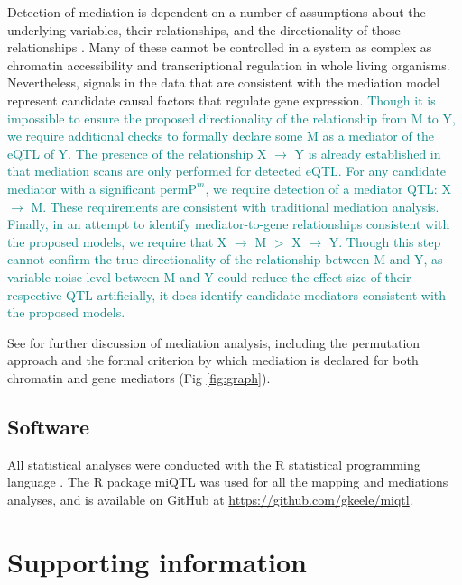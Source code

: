 \documentclass[10pt,letterpaper]{article}
\newcommand{\permpmed}{\text{permP}^{m}}
\newcommand{\GKinline}[1]{\textcolor{teal}{#1}}
\begin{document}
Detection of mediation is dependent on a number of assumptions about the underlying variables, their relationships, and the directionality of those relationships \cite{Mackinnon2007}. Many of these cannot be controlled in a system as complex as chromatin accessibility and transcriptional regulation in whole living organisms. Nevertheless, signals in the data that are consistent with the mediation model represent candidate causal factors that regulate gene expression. \GKinline{Though it is impossible to ensure the proposed directionality of the relationship from M to Y, we require additional checks to formally declare some M as a mediator of the eQTL of Y. The presence of the relationship X $\rightarrow$ Y is already established in that mediation scans are only performed for detected eQTL. For any candidate mediator with a significant $\permpmed$, we require detection of a mediator QTL: X $\rightarrow$ M. These requirements are consistent with traditional mediation analysis. Finally, in an attempt to identify mediator-to-gene relationships consistent with the proposed models, we require that X $\rightarrow$ M $>$ X $\rightarrow$ Y. Though this step cannot confirm the true directionality of the relationship between M and Y, as variable noise level between M and Y could reduce the effect size of their respective QTL artificially, it does identify candidate mediators consistent with the proposed models.}

See  for further discussion of mediation analysis, including the permutation approach and the formal criterion by which mediation is declared for both chromatin and gene mediators (Fig \ref{fig:graph}).

\subsection*{Software}

All statistical analyses were conducted with the R statistical programming language \cite{RSoftware2019}. The R package miQTL was used for all the mapping and mediations analyses, and is available on GitHub at \url{https://github.com/gkeele/miqtl}.

\section*{Supporting information}

\end{document}
